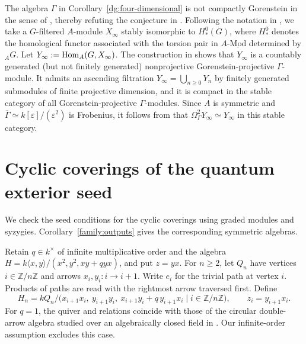 \documentclass[11pt]{article}
\begin{document}
\begin{Rem}
The algebra $\Gamma$ in Corollary~\ref{dg:four-dimensional} is not compactly Gorenstein in the sense of
\cite[Definition~1.3]{CXSO}, thereby refuting the conjecture in \cite[Section~1.2]{CXSO}.
Following the notation in \cite[Section~4.2]{CXSO}, we take a $G$-filtered
$A$-module $X_\infty$ stably isomorphic to $H_*^0(G)$, where $H_*^0$ denotes the homological functor associated with the torsion pair in $A\text{-}\underline{\mathrm{Mod}}$ determined by ${_A}G$. Let $Y_\infty:={\rm Hom}_A(G,X_\infty)$. The construction in \cite[proof of Corollary~1.4]{CXSO} shows that $Y_\infty$ is a countably generated (but not finitely generated) nonprojective Gorenstein-projective
$\Gamma$-module. It admits an ascending filtration $Y_\infty=\bigcup_{n\ge0}Y_n$ by finitely generated submodules of finite projective dimension, and it is compact in the stable category of all Gorenstein-projective $\Gamma$-modules. Since $A$ is symmetric and $\overline\Gamma\simeq k[\varepsilon]/(\varepsilon^2)$ is Frobenius, it follows from \cite[Corollary~4.11 and Lemma~3.17(2)]{CXSO} that $\Omega_\Gamma^2Y_\infty\simeq Y_\infty$ in this stable category.
\end{Rem}

\appendix
\section{Cyclic coverings of the quantum exterior seed}
\label{family:section}

We check the seed conditions for the cyclic coverings using graded
modules and syzygies. Corollary~\ref{family:outputs} gives the
corresponding symmetric algebras.

Retain $q\in k^\times$ of infinite multiplicative order and the algebra
$H=k\langle x,y\rangle/(x^2,y^2,xy+qyx)$, and put $z=yx$.
For $n\ge2$, let $Q_n$ have vertices
$i\in\mathbb Z/n\mathbb Z$ and arrows $x_i,y_i:i\to i+1$.
Write $e_i$ for the trivial path at vertex $i$.
Products of paths are read with the rightmost arrow traversed first.
Define
\begin{equation*}
 H_n=kQ_n/\bigl(x_{i+1}x_i,\ y_{i+1}y_i,
        \ x_{i+1}y_i+q\,y_{i+1}x_i\mid i\in\mathbb Z/n\mathbb Z\bigr),
 \qquad z_i=y_{i+1}x_i.
\end{equation*}
For $q=1$, the quiver and relations coincide with those of the
circular double-arrow algebra studied over an algebraically closed
field in \cite[Section~1 and Proposition~2.2]{Itaba}. Our
infinite-order assumption excludes this case.
\end{document}
